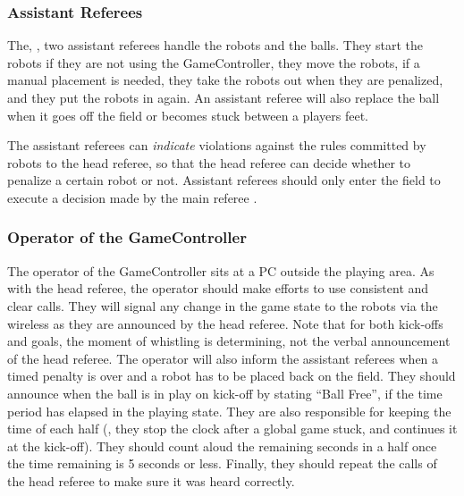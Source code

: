 \subsubsection{Assistant Referees}
\label{sec:assist_referee}
The, , two assistant referees handle the robots and the balls. They start the robots if they are not using the GameController, they move the robots, if a manual placement is needed, they take the robots out when they are penalized, and they put the robots in again. An assistant referee will also replace the ball when it goes off the field or becomes stuck between a players feet.


The assistant referees can \textit{indicate} violations against the rules committed by robots to the head referee, so that the head referee can decide whether to penalize a certain robot or not. Assistant referees should only enter the field to execute a decision made by the main referee .

\subsubsection{Operator of the GameController}
\label{sec:gameControllerOp}
The operator of the GameController sits at a PC outside the playing area.
As with the head referee, the operator should make efforts to use consistent and clear calls.
They will signal any change in the game state to the robots via the wireless as they are announced by the head referee.
Note that for both kick-offs and goals, the moment of whistling is determining, not the verbal announcement of the head referee.
The operator will also inform the assistant referees when a timed penalty is over and a robot has to be placed back on the field.
They should announce when the ball is in play on kick-off by stating ``Ball Free'', if the \KickOffBallFreeTime time period has elapsed in the playing state.
They are also responsible for keeping the time of each half (\ie, they stop the clock after a global game stuck, and continues it at the kick-off).
They should count aloud the remaining seconds in a half once the time remaining is 5 seconds or less.
Finally, they should repeat the calls of the head referee to make sure it was heard correctly.

